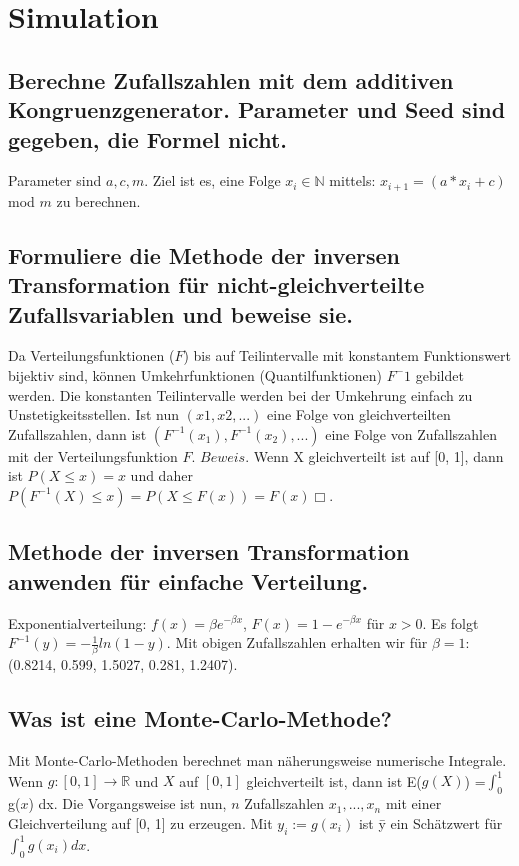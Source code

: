 \documentclass[a4paper,10pt]{article}
\begin{document}
\section{Simulation}
\subsection{Berechne Zufallszahlen mit dem additiven Kongruenzgenerator. Parameter und Seed sind gegeben, die Formel nicht.}
Parameter sind $a, c, m$. Ziel ist es, eine Folge $x_i \in \mathbb{N}$ mittels: \newline $x_{i+1} = (a*x_i + c)$ mod $m$ zu berechnen.

\subsection{Formuliere die Methode der inversen Transformation für nicht-gleichverteilte Zufallsvariablen und beweise sie.}
Da Verteilungsfunktionen ($F$) bis auf Teilintervalle mit konstantem Funktionswert bijektiv sind, können Umkehrfunktionen (Quantilfunktionen) $F^-1$ gebildet werden. Die konstanten Teilintervalle werden bei der Umkehrung einfach zu Unstetigkeitsstellen. Ist nun $(x 1 , x2 , . . .)$ eine Folge von gleichverteilten Zufallszahlen, dann ist $(F^{-1} (x_1), F^{-1} (x_2), . . .)$ eine Folge von Zufallszahlen mit der Verteilungsfunktion $F$.\newline
$Beweis.$ Wenn X gleichverteilt ist auf [0, 1], dann ist $P (X \leq x) = x$ und daher \newline 
$P(F^{-1} (X) \leq x) = P (X \leq F (x)) = F (x) \Box$.

\subsection{Methode der inversen Transformation anwenden für einfache Verteilung.}
Exponentialverteilung: $f(x) = \beta e^{-\beta x}$, $F(x) = 1 − e^{−\beta x}$ für $x > 0$. Es folgt $F^{-1} (y) = −\frac{1}{\beta} ln(1 - y)$. Mit obigen Zufallszahlen erhalten wir für $\beta = 1$:\newline
(0.8214, 0.599, 1.5027, 0.281, 1.2407).

\subsection{Was ist eine Monte-Carlo-Methode?}
Mit Monte-Carlo-Methoden berechnet man näherungsweise numerische Integrale. Wenn $g : [0, 1] \rightarrow \mathbb{R}$ und $X$ auf $[0, 1]$ gleichverteilt ist, dann ist E($g (X)$) =$\int_0^1$ g($x$) dx. Die Vorgangsweise ist nun, $n$ Zufallszahlen $x_1 , . . . , x_n$ mit einer Gleichverteilung auf [0, 1] zu erzeugen. Mit $y_i := g (x_i)$ ist \={y} ein Schätzwert für $\int_0^1 g(x_i)dx$.
\end{document}
